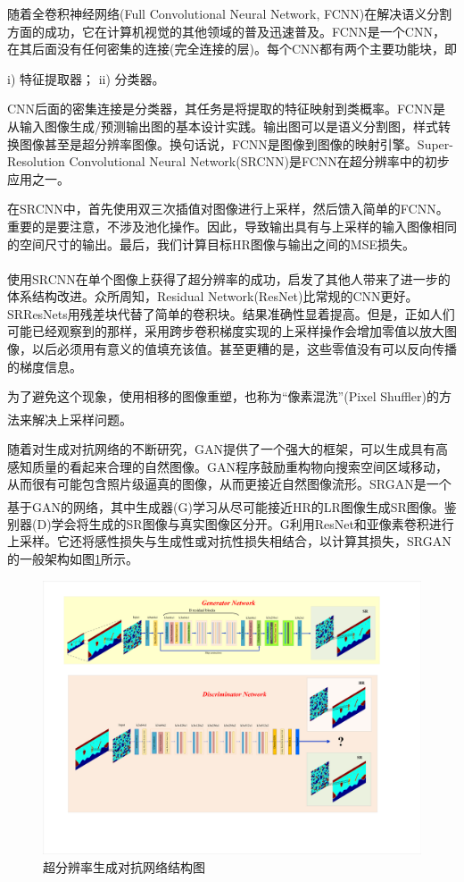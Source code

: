 \documentclass[11pt]{article}
\newcommand{\upcite}[1]{\textsuperscript{\textsuperscript{\cite{#1}}}}
\begin{document}
随着全卷积神经网络(Full Convolutional Neural Network, FCNN)在解决语义分割方面的成功，它在计算机视觉的其他领域的普及迅速普及。FCNN是一个CNN，在其后面没有任何密集的连接(完全连接的层)。每个CNN都有两个主要功能块，即
\par
i) 特征提取器；
ii) 分类器。
\par
CNN后面的密集连接是分类器，其任务是将提取的特征映射到类概率。FCNN是从输入图像生成/预测输出图的基本设计实践。输出图可以是语义分割图，样式转换图像甚至是超分辨率图像。换句话说，FCNN是图像到图像的映射引擎。Super-Resolution Convolutional Neural Network(SRCNN)是FCNN在超分辨率中的初步应用之一。
\par
在SRCNN中，首先使用双三次插值对图像进行上采样，然后馈入简单的FCNN。重要的是要注意，不涉及池化操作。因此，导致输出具有与上采样的输入图像相同的空间尺寸的输出。最后，我们计算目标HR图像与输出之间的MSE损失。
\par
使用SRCNN在单个图像上获得了超分辨率的成功\upcite{DongC2014}，启发了其他人带来了进一步的体系结构改进。众所周知，Residual Network(ResNet)比常规的CNN更好。SRResNets用残差块代替了简单的卷积块。结果准确性显着提高。但是，正如人们可能已经观察到的那样，采用跨步卷积梯度实现的上采样操作会增加零值以放大图像，以后必须用有意义的值填充该值。甚至更糟的是，这些零值没有可以反向传播的梯度信息。
\par
为了避免这个现象，使用相移的图像重塑，也称为``像素混洗''(Pixel Shuffler)的方法来解决上采样问题\upcite{ShiW2016}。
\par
随着对生成对抗网络的不断研究，GAN提供了一个强大的框架，可以生成具有高感知质量的看起来合理的自然图像。GAN程序鼓励重构物向搜索空间区域移动，从而很有可能包含照片级逼真的图像，从而更接近自然图像流形。SRGAN是一个基于GAN的网络\upcite{Ledig2017}，其中生成器(G)学习从尽可能接近HR的LR图像生成SR图像。鉴别器(D)学会将生成的SR图像与真实图像区分开。G利用ResNet和亚像素卷积进行上采样。它还将感性损失与生成性或对抗性损失相结合，以计算其损失，SRGAN的一般架构如图\ref{Fig_GAN}所示。
\par
\begin{figure}[htbp]
\centering
\includegraphics[width=5in]{./FigureFolder/Predict/GAN.pdf}
\caption{超分辨率生成对抗网络结构图}
\label{Fig_GAN}
\end{figure}
\end{document}
